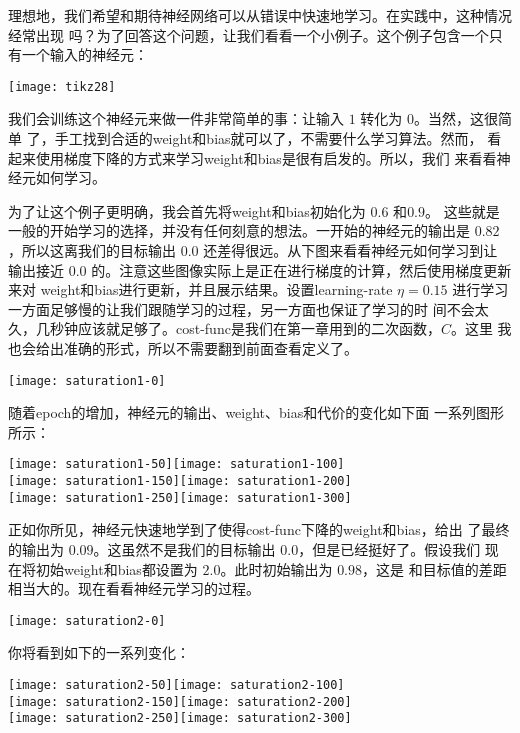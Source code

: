 理想地，我们希望和期待神经网络可以从错误中快速地学习。在实践中，这种情况经常出现
吗？为了回答这个问题，让我们看看一个小例子。这个例子包含一个只有一个输入的神经元：

\begin{center}
  \texttt{[image: tikz28]}
\end{center}

我们会训练这个神经元来做一件非常简单的事：让输入 $1$ 转化为 $0$。当然，这很简单
了，手工找到合适的\gls*{weight}和\gls*{bias}就可以了，不需要什么学习算法。然而，
看起来使用梯度下降的方式来学习\gls*{weight}和\gls*{bias}是很有启发的。所以，我们
来看看神经元如何学习。

为了让这个例子更明确，我会首先将\gls*{weight}和\gls*{bias}初始化为 $0.6$ 和$0.9$。
这些就是一般的开始学习的选择，并没有任何刻意的想法。一开始的神经元的输出是
$0.82$，所以这离我们的目标输出 $0.0$ 还差得很远。从下图来看看神经元如何学习到让
输出接近 $0.0$ 的。注意这些图像实际上是正在进行梯度的计算，然后使用梯度更新来对%
\gls*{weight}和\gls*{bias}进行更新，并且展示结果。设置\gls*{learning-rate}
$\eta=0.15$ 进行学习一方面足够慢的让我们跟随学习的过程，另一方面也保证了学习的时
间不会太久，几秒钟应该就足够了。\gls*{cost-func}是我们在第一章用到的二次函数，$C$。这里
我也会给出准确的形式，所以不需要翻到前面查看定义了。
\begin{center}
  \texttt{[image: saturation1-0]}
\end{center}
随着\gls*{epoch}的增加，神经元的输出、\gls*{weight}、\gls*{bias}和代价的变化如下面
一系列图形所示：
\begin{center}
    \texttt{[image: saturation1-50]}\texttt{[image: saturation1-100]}\\
    \texttt{[image: saturation1-150]}\texttt{[image: saturation1-200]}\\
    \texttt{[image: saturation1-250]}\texttt{[image: saturation1-300]}
\end{center}

正如你所见，神经元快速地学到了使得\gls*{cost-func}下降的\gls*{weight}和\gls*{bias}，给出
了最终的输出为 $0.09$。这虽然不是我们的目标输出 $0.0$，但是已经挺好了。假设我们
现在将初始\gls*{weight}和\gls*{bias}都设置为 $2.0$。此时初始输出为 $0.98$，这是
和目标值的差距相当大的。现在看看神经元学习的过程。
\begin{center}
  \texttt{[image: saturation2-0]}
\end{center}
你将看到如下的一系列变化：\label{saturation2_anchor}
\begin{center}
  \texttt{[image: saturation2-50]}\texttt{[image: saturation2-100]}\\
  \texttt{[image: saturation2-150]}\texttt{[image: saturation2-200]}\\
  \texttt{[image: saturation2-250]}\texttt{[image: saturation2-300]}
\end{center}

